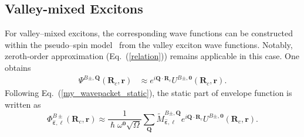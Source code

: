 \clearpage
\subsection{Valley-mixed Excitons}

For valley--mixed excitons, the corresponding wave functions can be constructed within the pseudo--spin model~\cite{peng2022tailoring} from the valley exciton wave functions. Notably,  zeroth-order approximation (Eq.~(\ref{relation})) remains applicable in this case. One obtains
\begin{equation}
\begin{aligned}
\Psi^{B\pm,\boldsymbol{Q}}(\boldsymbol{R}_c,\boldsymbol{r})
&\approx
e^{i\boldsymbol{Q}\cdot\boldsymbol{R}_c}
U^{B\pm ,\boldsymbol{0}} (\boldsymbol{R}_c,\boldsymbol{r}).
\end{aligned}
\label{mixed_function}
\end{equation}
Following Eq.~(\ref{my_wavepacket_static}), the static part of envelope function is written as
\begin{equation}
\Phi^{B\pm}_{\hat{\boldsymbol{\varepsilon}}, \ell}(\boldsymbol{R}_c, \boldsymbol{r})
\approx
\frac{1}{ \hslash \omega^{\boldsymbol{0}} \sqrt{\Omega}}
\sum_{\boldsymbol{Q}}
\tilde{M}_{\hat{\boldsymbol{\varepsilon}}, \ell}^{B\pm,\boldsymbol{Q}}
e^{i\boldsymbol{Q}\cdot\boldsymbol{R}_c}
U^{B\pm ,\boldsymbol{0}} (\boldsymbol{R}_c,\boldsymbol{r}).
\label{wavepacket_mix}
\end{equation}

